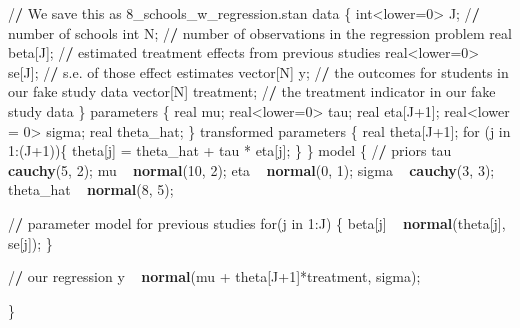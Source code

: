 \documentclass[]{book}
\newenvironment{Shaded}{\begin{snugshade}}{\end{snugshade}}
\newcommand{\KeywordTok}[1]{\textcolor[rgb]{0.13,0.29,0.53}{\textbf{{#1}}}}
\newcommand{\DecValTok}[1]{\textcolor[rgb]{0.00,0.00,0.81}{{#1}}}
\newcommand{\StringTok}[1]{\textcolor[rgb]{0.31,0.60,0.02}{{#1}}}
\newcommand{\ErrorTok}[1]{\textcolor[rgb]{0.64,0.00,0.00}{\textbf{{#1}}}}
\newcommand{\NormalTok}[1]{{#1}}
\begin{document}
\begin{Shaded}
\begin{Highlighting}[]
\NormalTok{/}\ErrorTok{/}\StringTok{ }\NormalTok{We save this as 8_schools_w_regression.stan}
\NormalTok{data \{}
  \NormalTok{int<lower=}\DecValTok{0}\NormalTok{>}\StringTok{ }\NormalTok{J; /}\ErrorTok{/}\StringTok{ }\NormalTok{number of schools }
  \NormalTok{int N; /}\ErrorTok{/}\StringTok{ }\NormalTok{number of observations in the regression problem}
  \NormalTok{real beta[J]; /}\ErrorTok{/}\StringTok{ }\NormalTok{estimated treatment effects from previous studies}
  \NormalTok{real<lower=}\DecValTok{0}\NormalTok{>}\StringTok{ }\NormalTok{se[J]; /}\ErrorTok{/}\StringTok{ }\NormalTok{s.e. of those effect estimates }
  \NormalTok{vector[N] y; /}\ErrorTok{/}\StringTok{ }\NormalTok{the outcomes for students in our fake study data}
  \NormalTok{vector[N] treatment; /}\ErrorTok{/}\StringTok{ }\NormalTok{the treatment indicator in our fake study data}
\NormalTok{\}}
\NormalTok{parameters \{}
  \NormalTok{real mu; }
  \NormalTok{real<lower=}\DecValTok{0}\NormalTok{>}\StringTok{ }\NormalTok{tau;}
  \NormalTok{real eta[J}\DecValTok{+1}\NormalTok{];}
  \NormalTok{real<lower =}\StringTok{ }\DecValTok{0}\NormalTok{>}\StringTok{ }\NormalTok{sigma;}
  \NormalTok{real theta_hat;}
\NormalTok{\}}
\NormalTok{transformed parameters \{}
  \NormalTok{real theta[J}\DecValTok{+1}\NormalTok{];}
  \NormalTok{for (j in }\DecValTok{1}\NormalTok{:(J}\DecValTok{+1}\NormalTok{))\{}
    \NormalTok{theta[j] =}\StringTok{ }\NormalTok{theta_hat +}\StringTok{ }\NormalTok{tau *}\StringTok{ }\NormalTok{eta[j];}
  \NormalTok{\}}
\NormalTok{\}}
\NormalTok{model \{}
  \NormalTok{/}\ErrorTok{/}\StringTok{ }\NormalTok{priors}
  \NormalTok{tau ~}\StringTok{ }\KeywordTok{cauchy}\NormalTok{(}\DecValTok{5}\NormalTok{, }\DecValTok{2}\NormalTok{);}
  \NormalTok{mu ~}\StringTok{ }\KeywordTok{normal}\NormalTok{(}\DecValTok{10}\NormalTok{, }\DecValTok{2}\NormalTok{);}
  \NormalTok{eta ~}\StringTok{ }\KeywordTok{normal}\NormalTok{(}\DecValTok{0}\NormalTok{, }\DecValTok{1}\NormalTok{);}
  \NormalTok{sigma ~}\StringTok{ }\KeywordTok{cauchy}\NormalTok{(}\DecValTok{3}\NormalTok{, }\DecValTok{3}\NormalTok{);}
  \NormalTok{theta_hat ~}\StringTok{ }\KeywordTok{normal}\NormalTok{(}\DecValTok{8}\NormalTok{, }\DecValTok{5}\NormalTok{);}
  
  \NormalTok{/}\ErrorTok{/}\StringTok{ }\NormalTok{parameter model for previous studies}
  \NormalTok{for(j in }\DecValTok{1}\NormalTok{:J) \{}
    \NormalTok{beta[j] ~}\StringTok{ }\KeywordTok{normal}\NormalTok{(theta[j], se[j]);}
  \NormalTok{\}}
  
  \NormalTok{/}\ErrorTok{/}\StringTok{ }\NormalTok{our regression}
  \NormalTok{y ~}\StringTok{ }\KeywordTok{normal}\NormalTok{(mu +}\StringTok{ }\NormalTok{theta[J}\DecValTok{+1}\NormalTok{]*treatment, sigma);}
  
\NormalTok{\}}
\end{Highlighting}
\end{Shaded}
\end{document}
